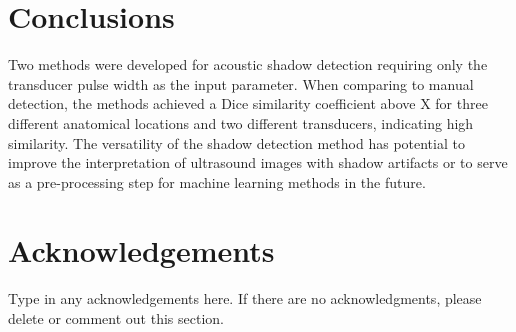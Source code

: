 \documentclass[preprint,5p]{elsarticle}
\begin{document}
\section*{Conclusions}
\label{Conclusions}
Two methods were developed for acoustic shadow detection requiring only the transducer pulse width as the input parameter. When comparing to manual detection, the methods achieved a Dice similarity coefficient above X for three different anatomical locations and two different transducers, indicating high similarity. The versatility of the shadow detection method has potential to improve the interpretation of ultrasound images with shadow artifacts or to serve as a pre-processing step for machine learning methods in the future.
        
\section*{Acknowledgements}
\label{Ack}
Type in any acknowledgements here.  If there are no acknowledgments, please delete or comment out this section.








\pagebreak

%
%

\begin{thebibliography}{00}
\end{thebibliography}
\end{document}
